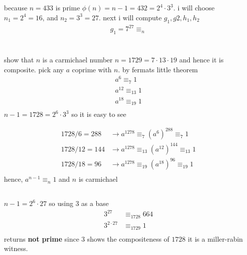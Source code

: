 \documentclass{article}
\begin{document}
\section{}
because $n = 433$ is prime $\phi(n) = n-1 = 432 = 2^{4}\cdot 3^{3}$.
i will choose $n_{1} = 2^{4} = 16$, and $n_{2} = 3^{3} = 27$.
next i will compute $g_{1}, g{2}, h_{1}, h_{2}$
\[
\begin{split}
g_{1} = 7^{27} \equiv_{n}
\end{split}
\]

\section{}
\subsection{}
show that $n$ is a carmichael number
\newline
$n = 1729 = 7 \cdot 13 \cdot 19$ and hence it is composite. pick any $a$ coprime with $n$. by fermats little theorem
\[ \label{eq1}
\begin{split}
a^{6} \equiv_{7} 1   \\
a^{12} \equiv_{13} 1 \\
a^{18} \equiv_{19} 1 \\
\end{split}
\]
$n-1 = 1728 = 2^{6} \cdot 3^{3}$ so it is easy to see

\[
\begin{split}
1728/6 = 288 & \rightarrow a^{1278} \equiv_{7} (a^{6})^{288} \equiv_{7} 1 \\
1728/12 = 144 & \rightarrow a^{1278} \equiv_{13} (a^{12})^{144} \equiv_{13} 1 \\
1728/18 = 96 & \rightarrow a^{1278} \equiv_{19} (a^{18})^{96} \equiv_{19} 1 \\
\end{split}
\]
hence, $a^{n-1} \equiv_{n} 1$ and $n$ is carmichael
\subsection{}
$n-1 = 2^{6} \cdot 27$ so using $3$ as a base
\[
\begin{split}
3^{27} &\equiv_{1728} 664 \\
3^{2 \cdot 27} &\equiv_{1729} 1 \\
\end{split}
\]
returns \textbf{not prime}
\newline
since $3$ shows the compositeness of $1728$ it is a miller-rabin witness.
\end{document}
